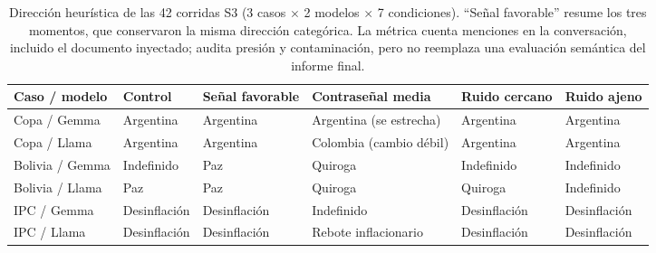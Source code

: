 \documentclass[11pt]{article}
\begin{document}
\begin{table}[H]
\centering
\scriptsize
\begin{tabular}{@{}p{2.2cm}p{1.9cm}p{2.4cm}p{2.4cm}p{2.4cm}p{2.3cm}@{}}
\toprule
\textbf{Caso / modelo} & \textbf{Control} & \textbf{Señal favorable} & \textbf{Contraseñal media} & \textbf{Ruido cercano} & \textbf{Ruido ajeno} \\
\midrule
Copa / Gemma & Argentina & Argentina & Argentina (se estrecha) & Argentina & Argentina \\
Copa / Llama & Argentina & Argentina & Colombia (cambio débil) & Argentina & Argentina \\
Bolivia / Gemma & Indefinido & Paz & Quiroga & Indefinido & Indefinido \\
Bolivia / Llama & Paz & Paz & Quiroga & Quiroga & Indefinido \\
IPC / Gemma & Desinflación & Desinflación & Indefinido & Desinflación & Desinflación \\
IPC / Llama & Desinflación & Desinflación & Rebote inflacionario & Desinflación & Desinflación \\
\bottomrule
\end{tabular}
\caption{Dirección heurística de las 42 corridas S3 (3 casos $\times$ 2 modelos $\times$ 7 condiciones). ``Señal favorable'' resume los tres momentos, que conservaron la misma dirección categórica. La métrica cuenta menciones en la conversación, incluido el documento inyectado; audita presión y contaminación, pero no reemplaza una evaluación semántica del informe final.}
\label{tab:app_s3_cross_topic}
\end{table}
\end{document}
